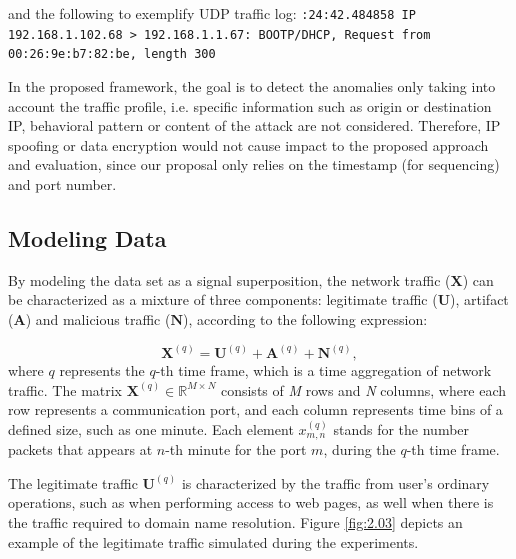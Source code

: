 and the following to exemplify UDP traffic log: 
\newline
\newline
\texttt{:24:42.484858 IP 192.168.1.102.68 > 192.168.1.1.67: BOOTP/DHCP, Request from 00:26:9e:b7:82:be, length 300}
\newline 

In the proposed framework, the goal is to detect the anomalies only taking into account the traffic profile, i.e. specific information such as origin or destination IP, behavioral pattern or content of the attack are not considered. Therefore, IP spoofing or data encryption would not cause impact to the proposed approach and evaluation, since our proposal only relies on the timestamp (for sequencing) and port number.

\subsection{Modeling Data}
\label{sec:2_ModelingData}

By modeling the data set as a signal superposition, the network traffic ($\pmb{X}$) can be characterized as a mixture of three components: legitimate traffic ($\pmb{U}$), artifact ($\pmb{A}$) and malicious traffic ($\pmb{N}$), according to the following expression:

\begin{equation}\label{eq:2.01}
	\pmb{X}^{(q)} = \pmb{U}^{(q)} + \pmb{A}^{(q)} + \pmb{N}^{(q)},
\end{equation}
where $q$ represents the $q$-th time frame, which is a time aggregation of network traffic. The matrix $\pmb{X}^{(q)} \in \mathbb{R}^{M \times N}$ consists of \emph{M} rows and \emph{N} columns, where each row represents a communication port, and each column represents time bins of a defined size, such as one minute. Each element $x_{m,n}^{(q)}$ stands for the number packets that appears at $n$-th minute for the port $m$, during the $q$-th time frame.

The legitimate traffic $\pmb{U}^{(q)}$ is characterized by the traffic from user's ordinary operations, such as when performing access to web pages, as well when there is the traffic required to domain name resolution. Figure \ref{fig:2.03} depicts an example of the legitimate traffic simulated during the experiments.

